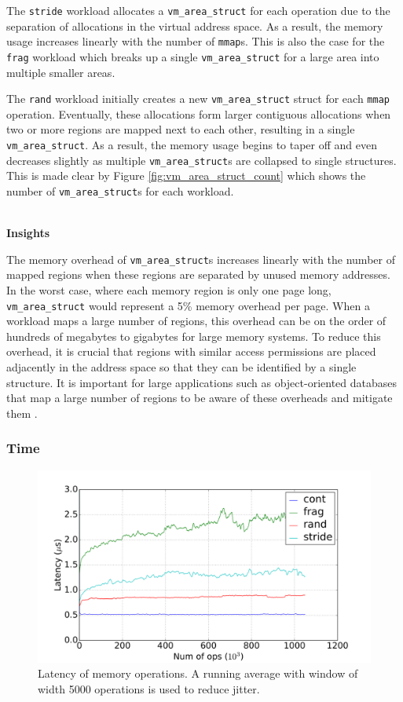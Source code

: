 \documentclass[twocolumn,11pt]{article}
\begin{document}
The \texttt{stride} workload allocates a
\texttt{vm\_area\_struct} for each operation due to the separation of
allocations in the virtual address space. As a result, the memory usage
increases linearly with the number of \texttt{mmap}s.
This is also the case for the \texttt{frag} workload which breaks up a single
\texttt{vm\_area\_struct} for a large area into
multiple smaller areas. 

The \texttt{rand} workload initially creates a new
\texttt{vm\_area\_struct} struct for each \texttt{mmap} operation. Eventually, these
allocations form larger contiguous allocations when two or more regions are
mapped next to each other, resulting in a single \texttt{vm\_area\_struct}. As a result, the memory usage begins to taper off and
even decreases slightly as multiple \texttt{vm\_area\_struct}s are collapsed to
single structures. This is made clear by Figure \ref{fig:vm_area_struct_count}
which shows the number of \texttt{vm\_area\_struct}s for each workload.

~\\ \textbf{Insights}

The memory overhead of \texttt{vm\_area\_struct}s increases linearly with the
number of mapped regions when these regions are separated by unused memory
addresses. In the worst case, where each memory region is only one page long, \texttt{vm\_area\_struct} would represent a 5\% memory overhead per page. When a workload maps a large number of regions, this overhead can be
on the order of hundreds of megabytes to gigabytes for large memory systems.  To
reduce this overhead, it is crucial that regions with similar access permissions
are placed adjacently in the address space so that they can be identified by a
single structure. It is important for large applications such as object-oriented
databases that map a large number of regions to be aware of these overheads and mitigate them \cite{utlk}.

\subsubsection{Time}

\begin{figure}[t]
    \includegraphics[width=\columnwidth]{figures/mmap_latency}
    \caption{Latency of memory operations. A running average with window of
    width 5000 operations is used to reduce jitter.}
    \label{fig:mmap_latency}
\end{figure}
\end{document}
